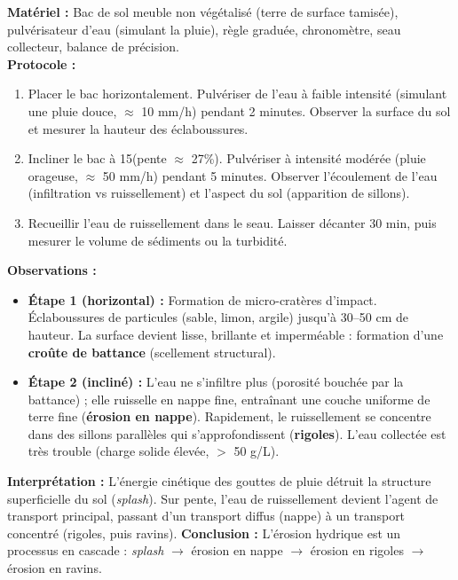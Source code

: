 \documentclass[11pt]{article}
\begin{document}
\begin{experience}
\textbf{Matériel :} Bac de sol meuble non végétalisé (terre de surface tamisée), pulvérisateur d'eau (simulant la pluie), règle graduée, chronomètre, seau collecteur, balance de précision.\\
\textbf{Protocole :}
\begin{enumerate}
    \item Placer le bac horizontalement. Pulvériser de l'eau à faible intensité (simulant une pluie douce, $\approx$ 10 mm/h) pendant 2 minutes. Observer la surface du sol et mesurer la hauteur des éclaboussures.
    \item Incliner le bac à 15\textdegree (pente $\approx$ 27\%). Pulvériser à intensité modérée (pluie orageuse, $\approx$ 50 mm/h) pendant 5 minutes. Observer l'écoulement de l'eau (infiltration vs ruissellement) et l'aspect du sol (apparition de sillons).
    \item Recueillir l'eau de ruissellement dans le seau. Laisser décanter 30 min, puis mesurer le volume de sédiments ou la turbidité.
\end{enumerate}
\textbf{Observations :}
\begin{itemize}
    \item \textbf{Étape 1 (horizontal) :} Formation de micro-cratères d'impact. Éclaboussures de particules (sable, limon, argile) jusqu'à 30--50 cm de hauteur. La surface devient lisse, brillante et imperméable : formation d'une \textbf{croûte de battance} (scellement structural).
    \item \textbf{Étape 2 (incliné) :} L'eau ne s'infiltre plus (porosité bouchée par la battance) ; elle ruisselle en nappe fine, entraînant une couche uniforme de terre fine (\textbf{érosion en nappe}). Rapidement, le ruissellement se concentre dans des sillons parallèles qui s'approfondissent (\textbf{rigoles}). L'eau collectée est très trouble (charge solide élevée, $>$ 50 g/L).
\end{itemize}
\textbf{Interprétation :} L'énergie cinétique des gouttes de pluie détruit la structure superficielle du sol (\emph{splash}). Sur pente, l'eau de ruissellement devient l'agent de transport principal, passant d'un transport diffus (nappe) à un transport concentré (rigoles, puis ravins).
\textbf{Conclusion :} L'érosion hydrique est un processus en cascade : \emph{splash} $\rightarrow$ érosion en nappe $\rightarrow$ érosion en rigoles $\rightarrow$ érosion en ravins.
\end{experience}
\end{document}
